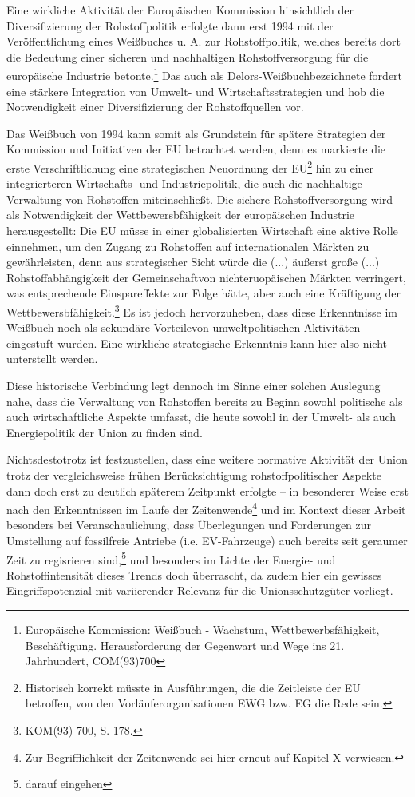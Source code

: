 \documentclass[12pt,a4paper,oneside]{book} %
\begin{document}
	Eine wirkliche Aktivität der Europäischen Kommission hinsichtlich der Diversifizierung der Rohstoffpolitik erfolgte dann erst 1994 mit der Veröffentlichung eines Weißbuches u. A. zur Rohstoffpolitik, welches bereits dort die Bedeutung einer sicheren und nachhaltigen Rohstoffversorgung für die europäische Industrie betonte.\footnote{Europäische Kommission: Weißbuch - Wachstum, Wettbewerbsfähigkeit, Beschäftigung. Herausforderung der Gegenwart und Wege ins 21. Jahrhundert, COM(93)700}
	Das auch als \glqq Delors-Weißbuch\grqq bezeichnete  fordert eine stärkere Integration von Umwelt- und Wirtschaftsstrategien und hob die Notwendigkeit einer Diversifizierung der Rohstoffquellen vor.
	
	
	Das Weißbuch von 1994 kann somit als Grundstein für spätere Strategien der Kommission und Initiativen der EU betrachtet werden, denn es markierte die erste Verschriftlichung eine strategischen Neuordnung der EU\footnote{Historisch korrekt müsste in Ausführungen, die die Zeitleiste der EU betroffen, von den Vorläuferorganisationen EWG bzw. EG die Rede sein.} hin zu einer integrierteren Wirtschafts- und Industriepolitik, die auch die nachhaltige Verwaltung von Rohstoffen miteinschließt. Die sichere Rohstoffversorgung wird als Notwendigkeit der Wettbewersbfähigkeit der europäischen Industrie herausgestellt: Die EU müsse in einer globalisierten Wirtschaft eine aktive Rolle einnehmen, um den Zugang zu  Rohstoffen auf internationalen Märkten zu gewährleisten, denn aus strategischer Sicht würde die \glqq (...) äußerst große (...) Rohstoffabhängigkeit der Gemeinschaft\grqq von nichteruopäischen Märkten verringert, was entsprechende Einspareffekte zur Folge hätte, aber auch eine Kräftigung der Wettbewersbfähigkeit.\footnote{KOM(93) 700, S. 178.} Es ist jedoch hervorzuheben, dass diese Erkenntnisse im Weißbuch noch als \glqq sekundäre Vorteile\grqq von umweltpolitischen Aktivitäten eingestuft wurden. Eine wirkliche strategische Erkenntnis kann hier also nicht unterstellt werden.
	
	Diese historische Verbindung legt dennoch im Sinne einer solchen Auslegung nahe, dass die Verwaltung von Rohstoffen bereits zu Beginn sowohl politische als auch wirtschaftliche Aspekte umfasst, die heute sowohl in der Umwelt- als auch Energiepolitik der Union zu finden sind.
	
	Nichtsdestotrotz ist festzustellen, dass eine weitere normative Aktivität der Union trotz der vergleichsweise frühen Berücksichtigung rohstoffpolitischer Aspekte dann doch erst zu deutlich späterem Zeitpunkt erfolgte -- in besonderer Weise erst nach den Erkenntnissen im Laufe der Zeitenwende\footnote{Zur Begrifflichkeit der Zeitenwende sei hier erneut auf Kapitel X verwiesen.} und im Kontext dieser Arbeit besonders bei Veranschaulichung, dass Überlegungen und Forderungen zur Umstellung auf fossilfreie Antriebe (i.e. EV-Fahrzeuge) auch bereits seit geraumer Zeit zu regisrieren sind,\footnote{darauf eingehen} und besonders im Lichte der Energie- und Rohstoffintensität dieses Trends doch überrascht, da zudem hier ein gewisses Eingriffspotenzial mit variierender Relevanz für die Unionsschutzgüter vorliegt. 
	
\end{document}
